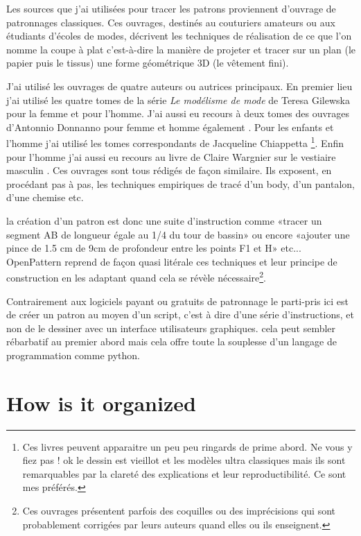 \documentclass[10pt,a4paper,twoside]{report}
\begin{document}
Les sources que j'ai utilisées pour tracer les patrons proviennent d'ouvrage de patronnages classiques. Ces ouvrages, destinés au couturiers amateurs ou aux étudiants d'écoles de modes, décrivent les techniques de réalisation de ce que l'on nomme la coupe à plat c'est-à-dire  la manière de projeter et tracer sur un plan (le papier puis le tissus) une forme géométrique 3D (le vêtement fini).

J'ai utilisé les ouvrages de quatre auteurs ou autrices principaux.
En premier lieu j'ai utilisé les quatre tomes de la série \textit{Le modélisme de mode} de Teresa Gilewska pour la femme et pour l'homme\cite{Gilewska1,Gilewska2,Gilewska4,Gilewska5}. J'ai aussi eu recours à deux tomes des ouvrages d'Antonnio Donnanno pour femme et homme également \cite{Donnanno2005,Donnanno2016}. Pour les enfants et l'homme j'ai utilisé les tomes correspondants de Jacqueline Chiappetta  \cite{Chiappetta1998,Chiappetta2000}\footnote{Ces livres peuvent apparaitre un peu peu ringards de prime abord. Ne vous y fiez pas ! ok le dessin est vieillot et les modèles ultra classiques mais ils sont remarquables par la clareté des explications et leur reproductibilité. Ce sont mes préférés.}. Enfin pour l'homme j'ai aussi eu recours au livre de  Claire Wargnier sur le vestiaire masculin \cite{wargnier2012}. Ces ouvrages sont tous rédigés de façon similaire. Ils exposent, en procédant pas à pas, les techniques empiriques de tracé d'un body, d'un pantalon, d'une chemise etc.

la création d'un patron est donc une suite d'instruction comme «tracer un segment AB de longueur égale au 1/4 du tour de bassin» ou encore «ajouter une pince de 1.5 cm de 9cm de profondeur entre les points F1 et H» etc...
OpenPattern reprend de façon quasi litérale ces techniques et leur principe de construction en les adaptant quand cela se révèle nécessaire\footnote{Ces ouvrages présentent parfois des coquilles ou des imprécisions qui  sont probablement corrigées par leurs auteurs quand elles ou ils enseignent.}.

Contrairement aux logiciels payant ou gratuits de patronnage le parti-pris ici est de créer  un patron au moyen d'un script, c'est à dire d'une série d'instructions, et non de le dessiner avec un interface utilisateurs graphiques. cela peut sembler rébarbatif au premier abord mais cela offre toute la souplesse d'un langage de programmation comme python.

\section{How is it organized}
\end{document}
